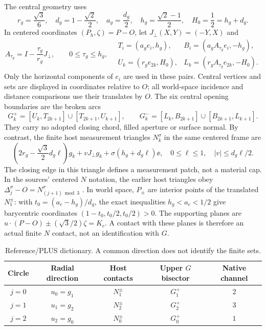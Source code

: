 The central geometry uses
\begin{equation}\label{eq:geomconstants}
 r_g=\frac{\sqrt3}{6},\quad d_g=1-\frac{\sqrt2}{2},\quad
 a_g=\frac{d_g}{2},\quad h_g=\frac{\sqrt2-1}{2},\quad
 H_0=\frac12=h_g+d_g.
\end{equation}
In centered coordinates $(P_h,\zeta)=P-O$, let $J_\perp(X,Y)=(-Y,X)$ and
\begin{equation}\label{eq:family}
 A_{\tau_g}=I-\frac{\tau_g}{r_g}J_\perp,\qquad 0\le\tau_g\le h_g,
 \quad
 \begin{array}{ll}
 T_i=(a_ge_i,h_g),&B_i=(a_gA_{\tau_g}e_i,-h_g),\\
 U_k=(r_ge_{2k},H_0),&L_k=(r_gA_{\tau_g}e_{2k},-H_0).
 \end{array}
\end{equation}
Only the horizontal components of $e_i$ are used in these pairs. Central vertices and sets are displayed in coordinates relative to $O$; all world-space incidence and distance comparisons use their translates by $O$. The six central opening boundaries are the broken arcs
\begin{equation}\label{eq:G}
 G_k^+=[U_k,T_{2k+1}]\cup[T_{2k+1},U_{k+1}],\qquad
 G_k^-=[L_k,B_{2k+1}]\cup[B_{2k+1},L_{k+1}].
\end{equation}
They carry no adopted closing chord, filled aperture or surface normal. By contrast, the finite host measurement triangles $N_k^\sigma$ in the same centered frame are
\begin{equation}\label{eq:N}
 \left(2r_g-\frac{\sqrt3}{2}d_g\ell\right)g_k
 +vJ_\perp g_k+\sigma(h_g+d_g\ell)\ee,
 \quad 0\le\ell\le1,\quad |v|\le d_g\ell/2.
\end{equation}
The closing edge in this triangle defines a measurement patch, not a material cap. In the sources' centered $N$ notation, the earlier host triangles obey $\Delta_j^\sigma-O=N_{(j+1)\bmod3}^\sigma$ \cite{PG,CG,CC}. In world space, $P_\pm$ are interior points of the translated $N_1^\pm$: with $t_0=(a_c-h_g)/d_g$, the exact inequalities $h_g<a_c<1/2$ give barycentric coordinates $(1-t_0,t_0/2,t_0/2)>0$. The supporting planes are $u\cdot(P-O)\pm(\sqrt3/2)\zeta=K_c$. A contact with these planes is therefore an actual finite $N$ contact, not an identification with $G$.

\begin{table}[htbp]\centering\small
\caption{Reference/PLUS dictionary. A common direction does not identify the finite sets.}\label{tab:dictionary}
\begin{tabular}{ccccc}\toprule
Circle & Radial direction & Host contacts & Upper $G$ bisector & Native channel\\\midrule
$j=0$ & $u_0=g_1$ & $N_1^\pm$ & $G_1^+$ & $2$\\
$j=1$ & $u_1=g_2$ & $N_2^\pm$ & $G_2^+$ & $3$\\
$j=2$ & $u_2=g_0$ & $N_0^\pm$ & $G_0^+$ & $1$\\\bottomrule
\end{tabular}
\end{table}

